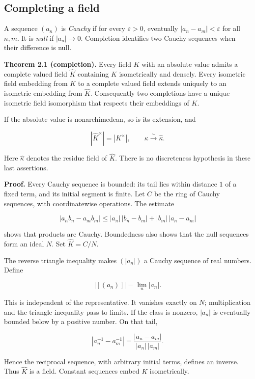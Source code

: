 \documentclass[
  english,
  11pt,
  a4paper,
]{article}
\begin{document}
\subsection{Completing a field}\label{NT-LOC-02--completing-a-field}

A sequence \((a_n)\) is \emph{Cauchy} if for every \(\varepsilon>0\),
eventually \(|a_n-a_m|<\varepsilon\) for all \(n,m\). It is \emph{null}
if \(|a_n|\to0\). Completion identifies two Cauchy sequences when their
difference is null.

\textbf{Theorem 2.1 (completion).} Every field \(K\) with an absolute
value admits a complete valued field \(\widehat K\) containing \(K\)
isometrically and densely. Every isometric field embedding from \(K\) to
a complete valued field extends uniquely to an isometric embedding from
\(\widehat K\). Consequently two completions have a unique isometric
field isomorphism that respects their embeddings of \(K\).

If the absolute value is nonarchimedean, so is its extension, and

\[|\widehat K^{\times}|=|K^{\times}|,
\qquad \kappa\xrightarrow{\sim}\widehat\kappa.\]

Here \(\widehat\kappa\) denotes the residue field of \(\widehat K\).
There is no discreteness hypothesis in these last assertions.

\textbf{Proof.} Every Cauchy sequence is bounded: its tail lies within
distance \(1\) of a fixed term, and its initial segment is finite. Let
\(C\) be the ring of Cauchy sequences, with coordinatewise operations.
The estimate

\[|a_nb_n-a_mb_m|
\le |a_n|\,|b_n-b_m|+|b_m|\,|a_n-a_m|\]

shows that products are Cauchy. Boundedness also shows that the null
sequences form an ideal \(N\). Set \(\widehat K=C/N\).

The reverse triangle inequality makes \((|a_n|)\) a Cauchy sequence of
real numbers. Define

\[|[(a_n)]|=\lim_n|a_n|.\]

This is independent of the representative. It vanishes exactly on \(N\);
multiplication and the triangle inequality pass to limits. If the class
is nonzero, \(|a_n|\) is eventually bounded below by a positive number.
On that tail,

\[|a_n^{-1}-a_m^{-1}|=\frac{|a_n-a_m|}{|a_n|\,|a_m|}.\]

Hence the reciprocal sequence, with arbitrary initial terms, defines an
inverse. Thus \(\widehat K\) is a field. Constant sequences embed \(K\)
isometrically.
\end{document}
